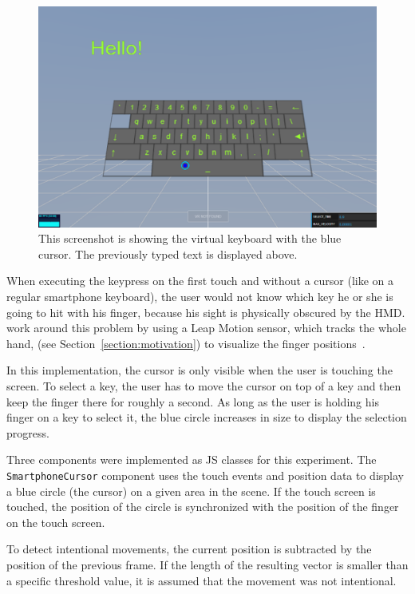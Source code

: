 \begin{figure}[H]
	\centering
	\includegraphics[width=12cm]{figures/implementation/screenshot_exp_vk.png}
	\caption[Screenshot of the virtual keyboard]{This screenshot is showing the virtual keyboard with the blue cursor. The previously typed text is displayed above.}\label{fig:screenshot-exp-vk}
\end{figure}

When executing the keypress on the first touch and without a cursor (like on a regular smartphone keyboard), the user would not know which key he or she is going to hit with his finger, because his sight is physically obscured by the \gls{HMD}. \citeauthor{Dias.2018} work around this problem by using a Leap Motion sensor, which tracks the whole hand, (see Section~\ref{section:motivation}) to visualize the finger positions~\cite[4]{Dias.2018}.

In this implementation, the cursor is only visible when the user is touching the screen. To select a key, the user has to move the cursor on top of a key and then keep the finger there for roughly a second. As long as the user is holding his finger on a key to select it, the blue circle increases in size to display the selection progress.

Three components were implemented as \acrlong{JS} classes for this experiment. The \lstinline{SmartphoneCursor} component uses the touch events and position data to display a blue circle (the cursor) on a given area in the scene. If the touch screen is touched, the position of the circle is synchronized with the position of the finger on the touch screen.

To detect intentional movements, the current position is subtracted by the position of the previous frame. If the length of the resulting vector is smaller than a specific threshold value, it is assumed that the movement was not intentional.

